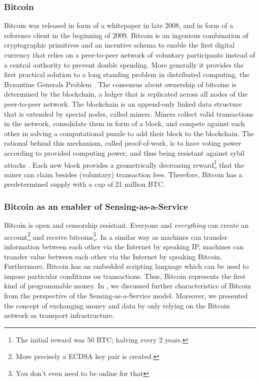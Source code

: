 \documentclass[a4paper, 12pt]{scrartcl}
\begin{document}
\subsubsection{Bitcoin}
Bitcoin was released in form of a whitepaper \parencite{nakamoto2008bitcoin} in late 2008, and in form of a reference client in the beginning of 2009. Bitcoin is an ingenious combination of cryptographic primitives and an incentive schema to enable the first digital currency that relies on a peer-to-peer network of voluntary participants instead of a central authority to prevent double spending. More generally it provides the first practical solution to a long standing problem in distributed computing, the Byzantine Generals Problem \parencite{Lamport:1982:BGP:357172.357176}. The consensus about ownership of bitcoins is determined by the blockchain, a ledger that is replicated across all nodes of the peer-to-peer network. The blockchain is an append-only linked data structure that is extended by special nodes, called miners. Miners collect valid transactions in the network, consolidate them in form of a block, and compete against each other in solving a computational puzzle to add their block to the blockchain. The rational behind this mechanism, called proof-of-work, is to have voting power according to provided computing power, and thus being resistant against sybil attacks \parencite{douceur2002sybil}. Each new block provides a geometrically decreasing reward\footnote{The initial reward was 50 BTC; halving every 2 years.} that the miner can claim besides (voluntary) transaction fees. Therefore, Bitcoin has a predetermined supply with a cap of 21 million BTC.

\subsubsection{Bitcoin as an enabler of Sensing-as-a-Service}

Bitcoin is open and censorship resistant. Everyone and \textit{everything} can create an account\footnote{More precisely a ECDSA key pair is created.} and receive bitcoins\footnote{You don't even need to be online for that}. In a similar way as machines can transfer information between each other via the Internet by speaking IP, machines can transfer value between each other via the Internet by speaking Bitcoin.
Furthermore, Bitcoin has an embedded scripting language which can be used to impose particular conditions on transactions. Thus, Bitcoin represents the first kind of programmable money. In \cite{DBLP:journals/corr/NoyenVWF14}, we discussed further characteristics of Bitcoin from the perspective of the Sensing-as-a-Service model. Moreover, we presented the concept of exchanging money and data by only relying on the Bitcoin network as transport infrastructure. 
\end{document}
